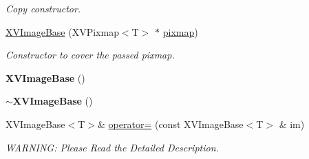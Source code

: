 \begin{CompactItemize}
\begin{CompactList}\small\item\em Copy constructor.\item\end{CompactList}\item 
\hyperlink{class_XVImageBase_a22}{XVImage\-Base} (XVPixmap$<$T$>$ $\ast$ \hyperlink{class_XVImageBase_n1}{pixmap})
\begin{CompactList}\small\item\em Constructor to cover the passed pixmap.\item\end{CompactList}\item 
\label{XVImageBase_a23}
\hypertarget{class_XVImageBase_a23}{
{\bf XVImage\-Base} ()}

\item 
\label{XVImageBase_a24}
\hypertarget{class_XVImageBase_a24}{
{\bf $\sim$XVImage\-Base} ()}

\item 
XVImage\-Base$<$T$>$\& \hyperlink{class_XVImageBase_a25}{operator=} (const XVImage\-Base$<$T$>$ \& im)
\begin{CompactList}\small\item\em WARNING: Please Read the Detailed Description.\item\end{CompactList}\end{CompactItemize}
